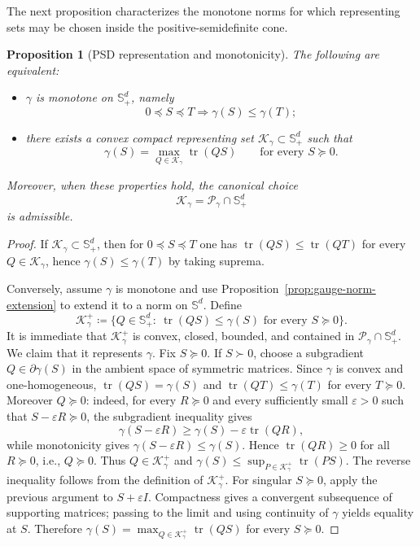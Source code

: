 \documentclass{article}
\newtheorem{proposition}[theorem]{Proposition}
\newcommand{\tr}{\operatorname{tr}}
\newcommand{\cPol}{\mathcal P_\gamma}
\newcommand{\cK}{\mathcal K_\gamma}
\begin{document}
The next proposition characterizes the monotone norms for which representing sets may be chosen inside the positive-semidefinite cone.
\begin{proposition}[PSD representation and monotonicity]
\label{prop:psdpolar}
The following are equivalent:
\begin{itemize}
\item $\gamma$ is monotone on $\mathbb S_+^d$, namely
$$
0\preceq S\preceq T \Longrightarrow \gamma(S)\le \gamma(T);
$$
\item there exists a convex compact representing set $\cK\subset \mathbb S_+^d$ such that
$$
\gamma(S)=\max_{Q\in \cK}\tr(QS)
\qquad\text{for every }S\succeq 0.
$$
\end{itemize}
Moreover, when these properties hold, the canonical choice
$$
\cK=\cPol\cap \mathbb S_+^d
$$
is admissible.
\end{proposition}

\begin{proof}
If $\cK\subset \mathbb S_+^d$, then for $0\preceq S\preceq T$ one has $\tr(QS)\le \tr(QT)$ for every $Q\in\cK$, hence $\gamma(S)\le \gamma(T)$ by taking suprema.


Conversely, assume $\gamma$ is monotone and use
Proposition~\ref{prop:gauge-norm-extension} to extend it to a norm on
$\mathbb S^d$. Define
$$
\cK^{+}\coloneqq
\{Q\in\mathbb S_+^d:\ \tr(QS)\le \gamma(S)\text{ for every }S\succeq0\}.
$$
It is immediate that $\cK^{+}$ is convex, closed, bounded, and contained in
$\cPol\cap\mathbb S_+^d$. We claim that it represents $\gamma$. Fix
$S\succeq0$. If $S\succ0$, choose a subgradient
$Q\in\partial\gamma(S)$ in the ambient space of symmetric matrices. Since
$\gamma$ is convex and one-homogeneous, $\tr(QS)=\gamma(S)$ and
$\tr(QT)\le\gamma(T)$ for every $T\succeq0$. Moreover $Q\succeq0$: indeed,
for every $R\succeq0$ and every sufficiently small $\varepsilon>0$ such that
$S-\varepsilon R\succeq0$, the subgradient inequality gives
$$
\gamma(S-\varepsilon R)\ge \gamma(S)-\varepsilon\tr(QR),
$$
while monotonicity gives $\gamma(S-\varepsilon R)\le\gamma(S)$. Hence
$\tr(QR)\ge0$ for all $R\succeq0$, i.e., $Q\succeq0$. Thus $Q\in\cK^{+}$
and $\gamma(S)\le\sup_{P\in\cK^{+}}\tr(PS)$. The reverse inequality follows
from the definition of $\cK^{+}$. For singular $S\succeq0$, apply the
previous argument to $S+\varepsilon I$. Compactness gives a convergent
subsequence of supporting matrices; passing to the limit and using continuity
of $\gamma$ yields equality at $S$. Therefore
$\gamma(S)=\max_{Q\in\cK^{+}}\tr(QS)$ for every $S\succeq0$.
\end{proof}
\end{document}
